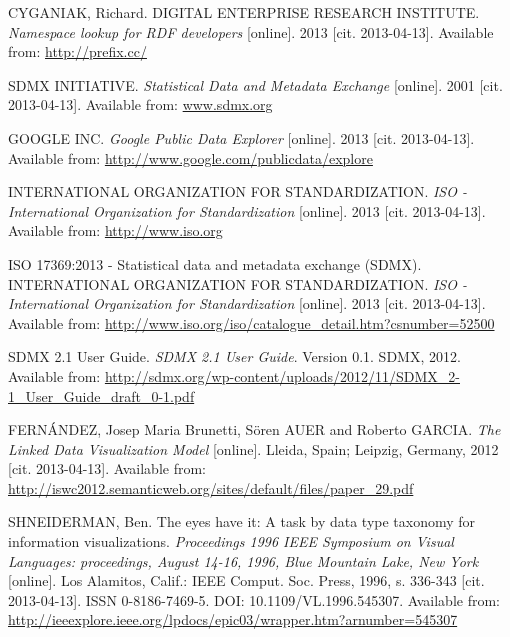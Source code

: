 
\def\bibname{Bibliography}
\begin{thebibliography}{99}
\addcontentsline{toc}{chapter}{\bibname}

  {\sc CYGANIAK,} Richard. DIGITAL ENTERPRISE RESEARCH INSTITUTE. 
  \emph{Namespace lookup for RDF developers}
  [online]. 2013 [cit. 2013-04-13]. Available from: \url{http://prefix.cc/}

  {\sc } SDMX INITIATIVE.
  \emph{Statistical Data and Metadata Exchange}
  [online]. 2001 [cit. 2013-04-13]. Available from: \url{www.sdmx.org}

  {\sc } GOOGLE INC.
  \emph{Google Public Data Explorer}
  [online]. 2013 [cit. 2013-04-13]. Available from: \url{http://www.google.com/publicdata/explore}

 {\sc } INTERNATIONAL ORGANIZATION FOR STANDARDIZATION.
 \emph{ISO - International Organization for Standardization}
 [online]. 2013 [cit. 2013-04-13]. Available from: \url{http://www.iso.org}
 
 {\sc} ISO 17369:2013 - Statistical data and metadata exchange (SDMX).
 INTERNATIONAL ORGANIZATION FOR STANDARDIZATION.
 \emph{ISO - International Organization for Standardization} [online]. 2013 [cit. 2013-04-13].
 Available from: \url{http://www.iso.org/iso/catalogue_detail.htm?csnumber=52500}
 
 {\sc } SDMX 2.1 User Guide.
 \emph{SDMX 2.1 User Guide}.
 Version 0.1. SDMX, 2012.
 Available from: \url{http://sdmx.org/wp-content/uploads/2012/11/SDMX_2-1_User_Guide_draft_0-1.pdf}

 {\sc FERNÁNDEZ,} Josep Maria Brunetti, Sören AUER and Roberto GARCIA.
 \emph{The Linked Data Visualization Model}
 [online]. Lleida, Spain; Leipzig, Germany, 2012
 [cit. 2013-04-13].
 Available from: \url{http://iswc2012.semanticweb.org/sites/default/files/paper_29.pdf}

 {\sc SHNEIDERMAN,} Ben.
 The eyes have it: A task by data type taxonomy for information visualizations.
 \emph{Proceedings 1996 IEEE Symposium on Visual Languages: proceedings,
 August 14-16, 1996, Blue Mountain Lake, New York}
 [online]. Los Alamitos, Calif.: IEEE Comput. Soc. Press, 1996, s. 336-343
 [cit. 2013-04-13]. ISSN 0-8186-7469-5. DOI: 10.1109/VL.1996.545307.
 Available from: \url{http://ieeexplore.ieee.org/lpdocs/epic03/wrapper.htm?arnumber=545307}


\end{thebibliography}
